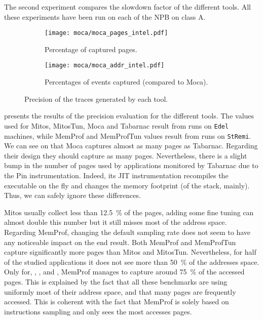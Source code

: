 The second experiment compares the
slowdown factor of the different tools.  All these experiments have been run on each of the \gls{NPB} on class A.

\begin{figure}[htb]
    \centering
    \begin{subfigure}{.49\linewidth}
        \texttt{[image: moca/moca\_pages\_intel.pdf]}
        \caption{Percentage of captured pages.}
        \label{fig:pages}
    \end{subfigure}
    \begin{subfigure}{.49\linewidth}
        \texttt{[image: moca/moca\_addr\_intel.pdf]}
        \caption{Percentages of events captured (compared to \gls{Moca}).}
        \label{fig:addr}
    \end{subfigure}
    \caption{Precision of the traces generated by each tool.}
    \label{fig:pages-addr}
\end{figure}

 presents the results of the precision evaluation for the
different tools. The values used for \gls{Mitos}, MitosTun, \gls{Moca} and
\gls{Tabarnac} result from runs on \texttt{Edel} machines, while \gls{MemProf} and MemProfTun values result from runs on
\texttt{StRemi}.
We can see on  that \gls{Moca} captures almost as many pages as \gls{Tabarnac}.
Regarding their design they should capture as many pages. Nevertheless, there is a slight
bump in the number of pages used by applications monitored by \gls{Tabarnac} due to the Pin instrumentation.
Indeed, its JIT instrumentation recompiles the executable on the fly and changes the memory footprint
(of the stack, mainly). Thus, we can safely ignore these differences.

\gls{Mitos} usually collect less than \SI{12.5}{\%} of the pages, adding some fine tuning
can almost double this number but it still misses most of the address space.
Regarding \gls{MemProf}, changing the default sampling rate does not seem to
have any noticeable impact on the end result. Both \gls{MemProf} and MemProfTun capture significantly more pages than
\gls{Mitos} and MitosTun. Nevertheless, for half of the studied applications it does
not see more than \SI{50}{\%} of the addresses space. Only for, \BT, \LU, \SP and \UA,
\gls{MemProf} manages to capture around \SI{75}{\%} of the accessed pages. This is explained by the fact that all these
benchmarks are using uniformly most of their address space, and that many pages are frequently accessed.
This is coherent with the fact that \gls{MemProf} is solely based on instructions sampling and only sees the most accesses pages.

